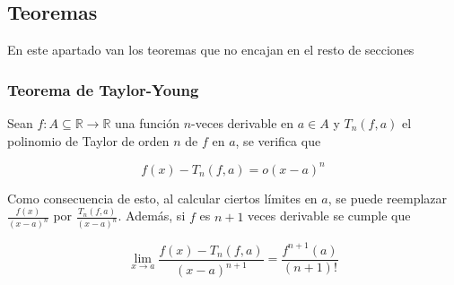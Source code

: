 \subsection{Teoremas}

En este apartado van los teoremas que no encajan en el resto de secciones

\subsubsection{Teorema de Taylor-Young}
\label{T:Taylor-Young}
Sean $f:A\subseteq \mathbb{R} \to \mathbb{R}$ una función $n$-veces derivable en $a\in A$ y $T_n(f,a)$ el polinomio de Taylor de orden $n$ de $f$ en $a$, se verifica que

\[f(x)-T_n(f,a)=o(x-a)^n\]

Como consecuencia de esto, al calcular ciertos límites en $a$, se puede reemplazar $\frac{f(x)}{(x-a)^n}$ por $\frac{T_n(f,a)}{(x-a)^n}$. Además, si $f$ es $n+1$ veces derivable se cumple que

\[\lim_{x\to a}\frac{f(x)-T_n(f,a)}{(x-a)^{n+1}}=\frac{f^{n+1}(a)}{(n+1)!}\]

\newpage